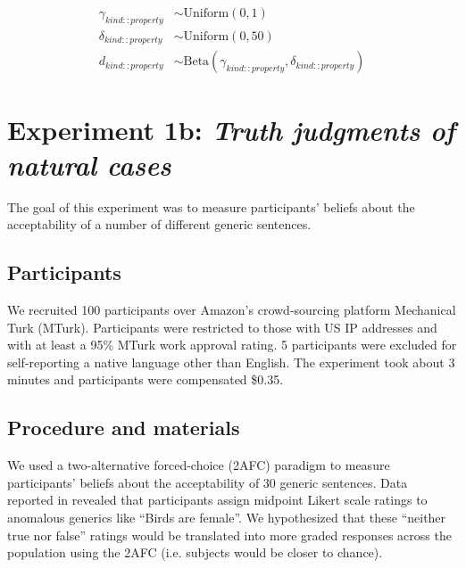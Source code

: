 \documentclass[10pt,letterpaper]{article}
\begin{document}
\begin{align*}
\gamma_{kind::property} & \sim \text{Uniform}(0, 1) \\
\delta_{kind::property} & \sim \text{Uniform}(0, 50) \\
d_{kind::property} & \sim \text{Beta}(\gamma_{kind::property}, \delta_{kind::property}) 
\end{align*}



\section{Experiment 1b: \emph{Truth judgments of natural cases}}

The goal of this experiment was to measure participants' beliefs about the acceptability of a number of different generic sentences. 

\subsection{Participants}

We recruited 100 participants over Amazon's crowd-sourcing platform Mechanical Turk (MTurk).  Participants were restricted to those with US IP addresses and with at least a 95\% MTurk work approval rating. 
5 participants were excluded for self-reporting a native language other than English. 
The experiment took about 3 minutes and participants were compensated \$0.35.

\subsection{Procedure and materials}

We used a two-alternative forced-choice (2AFC) paradigm to measure participants' beliefs about the acceptability of 30 generic sentences. 
Data reported in  revealed that participants assign midpoint Likert scale ratings to anomalous generics like ``Birds are female''. 
We hypothesized that these ``neither true nor false'' ratings would be translated into more graded responses across the population using the 2AFC (i.e. subjects would be closer to chance).
\end{document}
